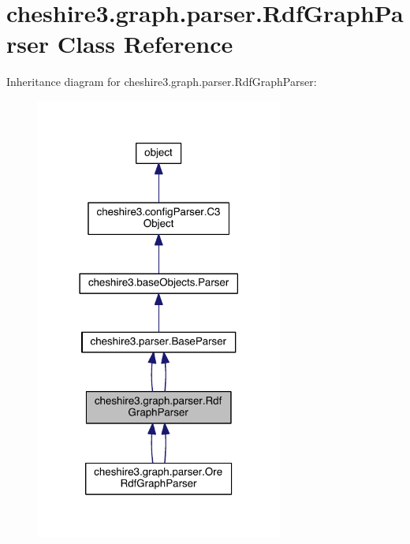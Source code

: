 \hypertarget{classcheshire3_1_1graph_1_1parser_1_1_rdf_graph_parser}{\section{cheshire3.\-graph.\-parser.\-Rdf\-Graph\-Parser Class Reference}
\label{classcheshire3_1_1graph_1_1parser_1_1_rdf_graph_parser}
}


Inheritance diagram for cheshire3.\-graph.\-parser.\-Rdf\-Graph\-Parser\-:
\nopagebreak
\begin{figure}[H]
\begin{center}
\leavevmode
\includegraphics[width=230pt]{classcheshire3_1_1graph_1_1parser_1_1_rdf_graph_parser__inherit__graph}
\end{center}
\end{figure}


